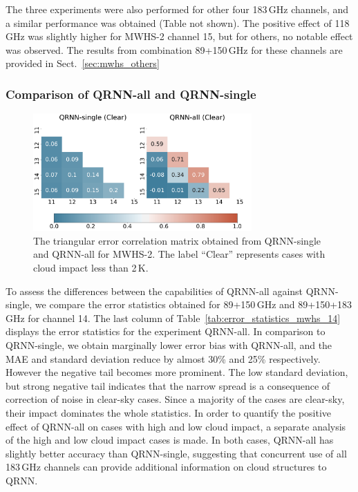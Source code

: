 \documentclass[amt]{copernicus}
\begin{document}
The three experiments were also performed for other four 183\,GHz channels, and a similar performance was obtained (Table not shown). The positive effect of 118\,GHz was slightly higher for MWHS-2 channel 15, but for others, no notable effect was observed. The results from combination 89+150\,GHz for these channels are provided in Sect.~\ref{sec:mwhs_others} 

\subsubsection{Comparison of QRNN-all and QRNN-single}
%
\begin{figure}[t]
	\centering
	\includegraphics[height=45mm]{Figures/correlation.pdf} 
	\caption{ The triangular error correlation matrix obtained from QRNN-single and QRNN-all for MWHS-2. The label ``Clear'' represents cases with cloud impact less than 2\,K.}
	\label{fig:correlations_mwhs}	
\end{figure}
To assess the differences between the capabilities of QRNN-all against QRNN-single, we  compare the error statistics obtained for 89+150\,GHz and 89+150+183\,GHz for channel 14. The last column of Table~\ref{tab:error_statistics_mwhs_14} displays the error statistics for the experiment QRNN-all. In comparison to QRNN-single, we obtain marginally lower error bias with QRNN-all, and the MAE and standard deviation reduce by almost 30\% and 25\% respectively. However the negative tail becomes more prominent. The low standard deviation, but strong negative tail indicates that the narrow spread is a consequence of correction of noise in clear-sky cases. Since a majority of the cases are clear-sky, their impact dominates the whole statistics. In order to quantify the positive effect of QRNN-all on cases with high and low cloud impact, a separate analysis of the high and low cloud impact cases is made. In both cases, QRNN-all has slightly better accuracy than QRNN-single, suggesting that concurrent use of all 183\,GHz channels can provide additional information on cloud structures to QRNN. 
\end{document}
